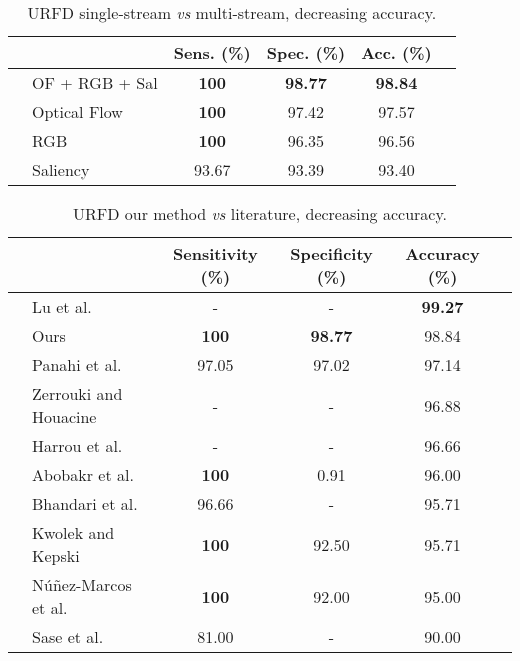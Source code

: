 \documentclass[conference]{IEEEtran}
\begin{document}
\begin{table}[]
\centering
\caption{URFD single-stream \textit{vs} multi-stream, decreasing accuracy.}
\label{tab:urfd-ensem}
\begin{tabular}{llcccl}
\hline
 &  & Sens. (\%) & Spec. (\%) & Acc. (\%) &  \\ \hline
 & OF + RGB + Sal & \textbf{100} & \textbf{98.77} & \textbf{98.84} &  \\
 & Optical Flow & \textbf{100} & 97.42 & 97.57 &  \\
 & RGB & \textbf{100} & 96.35 & 96.56 &  \\
 & Saliency & 93.67 & 93.39 & 93.40 &  \\ \hline
\end{tabular}
\end{table}

\begin{table*}[t]
\centering
\caption{URFD our method \textit{vs} literature, decreasing accuracy.}
\label{tab:urfd-our-their}
\begin{tabular}{llcccl}
\hline
 &                                                      & Sensitivity (\%)  & Specificity (\%)  & Accuracy (\%)     & \\ \hline
 & Lu et al.~\cite{lu2018deep}                          & -                 & -                 & \textbf{99.27}    & \\
 & Ours                                                 & \textbf{100}      & \textbf{98.77}    & 98.84             & \\
 & Panahi et al.~\cite{panahi2018human}                 & 97.05             & 97.02             & 97.14             & \\
 & Zerrouki and Houacine~\cite{zerrouki2018combined}    & -                 & -                 & 96.88             & \\
 & Harrou et al.~\cite{harrou2017vision}                & -                 & -                 & 96.66             & \\
 & Abobakr et al.~\cite{abobakr2017skeleton}            & \textbf{100}      & 0.91              & 96.00             & \\
 & Bhandari et al.~\cite{bhandari2017novel}             & 96.66             & -                 & 95.71             & \\
 & Kwolek and Kepski~\cite{kwolek2015improving}         & \textbf{100}      & 92.50             & 95.71             & \\
 & N\'u\~nez-Marcos et al.~\cite{nunez2017vision}       & \textbf{100}      & 92.00             & 95.00             & \\
 & Sase et al.~\cite{sase2018human}                     & 81.00             & -                 & 90.00             & \\ \hline
\end{tabular}
\end{table*}
\end{document}
